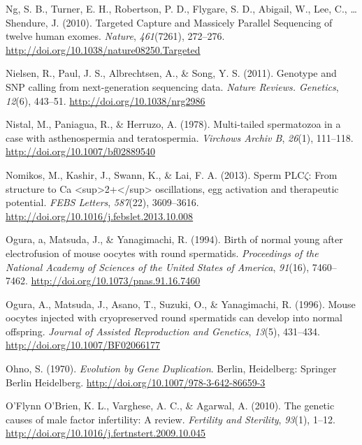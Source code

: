 \documentclass[12pt,twoside]{reedthesis}
\theoremstyle{definition}
\theoremstyle{definition}
\theoremstyle{remark}
\begin{document}
  \hypertarget{ref-Ng2010}{}
  Ng, S. B., Turner, E. H., Robertson, P. D., Flygare, S. D., Abigail, W.,
  Lee, C., \ldots{} Shendure, J. (2010). Targeted Capture and Massicely
  Parallel Sequencing of twelve human exomes. \emph{Nature},
  \emph{461}(7261), 272--276.
  \url{http://doi.org/10.1038/nature08250.Targeted}
  
  \hypertarget{ref-Nielsen2011}{}
  Nielsen, R., Paul, J. S., Albrechtsen, A., \& Song, Y. S. (2011).
  Genotype and SNP calling from next-generation sequencing data.
  \emph{Nature Reviews. Genetics}, \emph{12}(6), 443--51.
  \url{http://doi.org/10.1038/nrg2986}
  
  \hypertarget{ref-Nistal}{}
  Nistal, M., Paniagua, R., \& Herruzo, A. (1978). Multi-tailed
  spermatozoa in a case with asthenospermia and teratospermia.
  \emph{Virchows Archiv B}, \emph{26}(1), 111--118.
  \url{http://doi.org/10.1007/bf02889540}
  
  \hypertarget{ref-Nomikos2013}{}
  Nomikos, M., Kashir, J., Swann, K., \& Lai, F. A. (2013). Sperm
  PLC\(\zeta\): From structure to Ca
  \textless{}sup\textgreater{}2+\textless{}/sup\textgreater{}
  oscillations, egg activation and therapeutic potential. \emph{FEBS
  Letters}, \emph{587}(22), 3609--3616.
  \url{http://doi.org/10.1016/j.febslet.2013.10.008}
  
  \hypertarget{ref-Ogura1994}{}
  Ogura, a, Matsuda, J., \& Yanagimachi, R. (1994). Birth of normal young
  after electrofusion of mouse oocytes with round spermatids.
  \emph{Proceedings of the National Academy of Sciences of the United
  States of America}, \emph{91}(16), 7460--7462.
  \url{http://doi.org/10.1073/pnas.91.16.7460}
  
  \hypertarget{ref-Kimura1995}{}
  Ogura, A., Matsuda, J., Asano, T., Suzuki, O., \& Yanagimachi, R.
  (1996). Mouse oocytes injected with cryopreserved round spermatids can
  develop into normal offspring. \emph{Journal of Assisted Reproduction
  and Genetics}, \emph{13}(5), 431--434.
  \url{http://doi.org/10.1007/BF02066177}
  
  \hypertarget{ref-Ohno1970}{}
  Ohno, S. (1970). \emph{Evolution by Gene Duplication}. Berlin,
  Heidelberg: Springer Berlin Heidelberg.
  \url{http://doi.org/10.1007/978-3-642-86659-3}
  
  \hypertarget{ref-OFlynnOBrien2010}{}
  O'Flynn O'Brien, K. L., Varghese, A. C., \& Agarwal, A. (2010). The
  genetic causes of male factor infertility: A review. \emph{Fertility and
  Sterility}, \emph{93}(1), 1--12.
  \url{http://doi.org/10.1016/j.fertnstert.2009.10.045}
  
\end{document}
